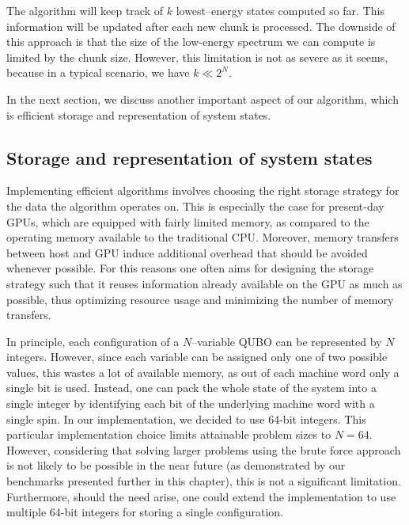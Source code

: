The algorithm will keep track of $k$ lowest--energy states computed so far.
This information will be updated after each new chunk is processed. The
downside of this approach is that the size of the low-energy spectrum we can
compute is limited by the chunk size. However, this limitation is not as severe
as it seems, because in a typical scenario, we have $k \ll 2^{N}$.

In the next section, we discuss another important aspect of our algorithm,
which is efficient storage and representation of system states.

\subsection{Storage and representation of system states}
Implementing efficient algorithms involves choosing the right storage strategy
for the data the algorithm operates on. This is especially the case for
present-day GPUs, which are equipped with fairly limited memory, as compared to
the operating memory available to the traditional CPU. Moreover, memory
transfers between host and GPU induce additional overhead that should be
avoided whenever possible. For this reasons one often aims for designing the
storage strategy such that it reuses information already available on the GPU
as much as possible, thus optimizing resource usage and minimizing the number
of memory transfers.

In principle, each configuration of a $N$--variable QUBO can be represented by
$N$ integers. However, since each variable can be assigned only one of two
possible values, this wastes a lot of available memory, as out of each machine
word only a single bit is used. Instead, one can pack the whole state of the
system into a single integer by identifying each bit of the underlying machine
word with a single spin. In our implementation, we decided to use 64-bit
integers. This particular implementation choice limits attainable problem sizes
to $N=64$. However, considering that solving larger problems using the brute
force approach is not likely to be possible in the near future (as demonstrated
by our benchmarks presented further in this chapter), this is not a significant
limitation. Furthermore, should the need arise, one could extend the
implementation to use multiple 64-bit integers for storing a single
configuration.

